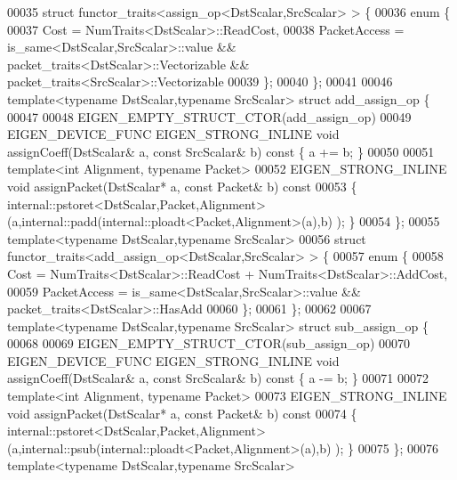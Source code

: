 \begin{DoxyCode}
00035 \textcolor{keyword}{struct }functor\_traits<assign\_op<DstScalar,SrcScalar> > \{
00036   \textcolor{keyword}{enum} \{
00037     Cost = NumTraits<DstScalar>::ReadCost,
00038     PacketAccess = is\_same<DstScalar,SrcScalar>::value && packet\_traits<DstScalar>::Vectorizable && 
      packet\_traits<SrcScalar>::Vectorizable
00039   \};
00040 \};
00041 
00046 \textcolor{keyword}{template}<\textcolor{keyword}{typename} DstScalar,\textcolor{keyword}{typename} SrcScalar> \textcolor{keyword}{struct }add\_assign\_op \{
00047 
00048   EIGEN\_EMPTY\_STRUCT\_CTOR(add\_assign\_op)
00049   EIGEN\_DEVICE\_FUNC EIGEN\_STRONG\_INLINE \textcolor{keywordtype}{void} assignCoeff(DstScalar& a, \textcolor{keyword}{const} SrcScalar& b)\textcolor{keyword}{ const }\{ a += b; 
      \}
00050   
00051   \textcolor{keyword}{template}<\textcolor{keywordtype}{int} Alignment, \textcolor{keyword}{typename} Packet>
00052   EIGEN\_STRONG\_INLINE \textcolor{keywordtype}{void} assignPacket(DstScalar* a, \textcolor{keyword}{const} Packet& b)\textcolor{keyword}{ const}
00053 \textcolor{keyword}{  }\{ internal::pstoret<DstScalar,Packet,Alignment>(a,internal::padd(internal::ploadt<Packet,Alignment>(a),b)
      ); \}
00054 \};
00055 \textcolor{keyword}{template}<\textcolor{keyword}{typename} DstScalar,\textcolor{keyword}{typename} SrcScalar>
00056 \textcolor{keyword}{struct }functor\_traits<add\_assign\_op<DstScalar,SrcScalar> > \{
00057   \textcolor{keyword}{enum} \{
00058     Cost = NumTraits<DstScalar>::ReadCost + NumTraits<DstScalar>::AddCost,
00059     PacketAccess = is\_same<DstScalar,SrcScalar>::value && packet\_traits<DstScalar>::HasAdd
00060   \};
00061 \};
00062 
00067 \textcolor{keyword}{template}<\textcolor{keyword}{typename} DstScalar,\textcolor{keyword}{typename} SrcScalar> \textcolor{keyword}{struct }sub\_assign\_op \{
00068 
00069   EIGEN\_EMPTY\_STRUCT\_CTOR(sub\_assign\_op)
00070   EIGEN\_DEVICE\_FUNC EIGEN\_STRONG\_INLINE \textcolor{keywordtype}{void} assignCoeff(DstScalar& a, \textcolor{keyword}{const} SrcScalar& b)\textcolor{keyword}{ const }\{ a -= b; 
      \}
00071   
00072   \textcolor{keyword}{template}<\textcolor{keywordtype}{int} Alignment, \textcolor{keyword}{typename} Packet>
00073   EIGEN\_STRONG\_INLINE \textcolor{keywordtype}{void} assignPacket(DstScalar* a, \textcolor{keyword}{const} Packet& b)\textcolor{keyword}{ const}
00074 \textcolor{keyword}{  }\{ internal::pstoret<DstScalar,Packet,Alignment>(a,internal::psub(internal::ploadt<Packet,Alignment>(a),b)
      ); \}
00075 \};
00076 \textcolor{keyword}{template}<\textcolor{keyword}{typename} DstScalar,\textcolor{keyword}{typename} SrcScalar>

\end{DoxyCode}
